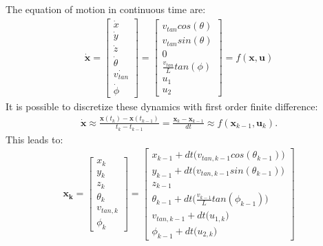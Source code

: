 The equation of motion in continuous time are:
\begin{align}
\boldsymbol{\dot{x}}  = 
\begin{bmatrix}
\dot{x}  \\[10pt]
\dot{y}  \\[10pt]
\dot{z} \\[10pt]
\dot{\theta} \\[10pt]
\dot{v_{tan}}  \\[10pt]
\dot{\phi}
\end{bmatrix}
= 
\begin{bmatrix}
v_{tan} cos(\theta) \\[10pt]
v_{tan} sin(\theta) \\[10pt]
 0 \\[10pt]
\frac{v_{tan}}{L}tan(\phi)\\[10pt]
u_1 \\[10pt]
 u_2 
\end{bmatrix}
=  f(\boldsymbol{x},\boldsymbol{u})
\label{eq:equation_nonholonomic_continuos}
\end{align}
It is possible to discretize these dynamics with first order finite difference:
\begin{align}
\boldsymbol{\dot{x}} \approx \frac{\boldsymbol{x}(t_k)- \boldsymbol{x}(t_{k-1}) }{ t_k - t_{k-1}} = \frac{\boldsymbol{x}_k - \boldsymbol{x}_{k-1} }{dt} \approx f(\boldsymbol{x}_{k-1},\boldsymbol{u}_k).
\end{align}
This leads to:
\begin{align}
\boldsymbol{x_k} = 
\begin{bmatrix}
x_k  \\[10pt]
y_k  \\[10pt]
z_k \\[10pt]
\theta_k \\[10pt]
v_{tan,k}  \\[10pt]
\phi_k
\end{bmatrix}
= 
\begin{bmatrix}
 x_{k-1} + dt \big(v_{tan,k-1} cos(\theta_{k-1})\big) \\[10pt]
 y_{k-1} + dt \big(v_{tan,k-1} sin(\theta_{k-1})\big) \\[10pt]
 z_{k-1} \\[10pt]
 \theta_{k-1} + dt\Big(\frac{v_{k-1}}{L}tan(\phi_{k-1}) \Big)\\[10pt]
v_{tan,k-1} + dt \big(u_{1,k}\big) \\[10pt]
\phi_{k-1} + dt \big(u_{2,k}\big) 
\end{bmatrix}
\label{eq:equation_nonholonomic_discrete}
\end{align}

